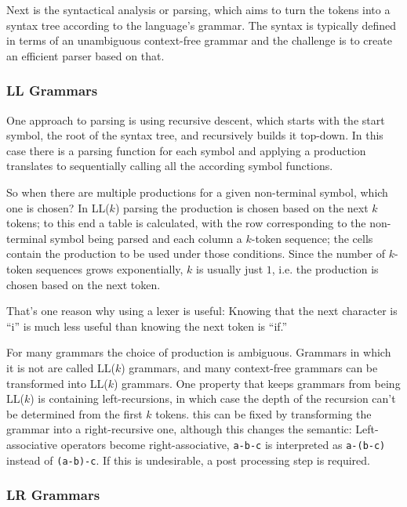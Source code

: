 			Next is the syntactical analysis or parsing, which aims to turn the tokens into a syntax tree according to the language's grammar. The syntax is typically defined in terms of an unambiguous context-free grammar and the challenge is to create an efficient parser based on that.
			
			\subsubsection{LL Grammars}
			
			One approach to parsing is using recursive descent, which starts with the start symbol, the root of the syntax tree, and recursively builds it top-down. In this case there is a parsing function for each symbol and applying a production translates to sequentially calling all the according symbol functions.
			
			So when there are multiple productions for a given non-terminal symbol, which one is chosen? In LL($k$) parsing the production is chosen based on the next $k$ tokens; to this end a table is calculated, with the row corresponding to the non-terminal symbol being parsed and each column a $k$-token sequence; the cells contain the production to be used under those conditions. Since the number of $k$-token sequences grows exponentially, $k$ is usually just $1$, i.e. the production is chosen based on the next token.
			
			That's one reason why using a lexer is useful: Knowing that the next character is ``i'' is much less useful than knowing the next token is ``if.''
			
			For many grammars the choice of production is ambiguous. Grammars in which it is not are called LL($k$) grammars, and many context-free grammars can be transformed into LL($k$) grammars. One property that keeps grammars from being LL($k$) is containing left-recursions, in which case the depth of the recursion can't be determined from the first $k$ tokens. this can be fixed by transforming the grammar into a right-recursive one, although this changes the semantic: Left-associative operators become right-associative, \lstinline$a-b-c$ is interpreted as \lstinline$a-(b-c)$ instead of \lstinline$(a-b)-c$. If this is undesirable, a post processing step is required.
			
			\subsubsection{LR Grammars}
			
